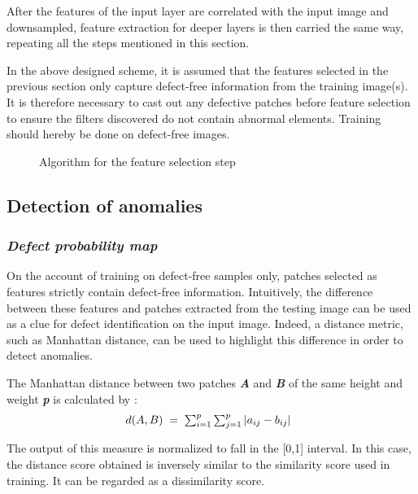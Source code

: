 \documentclass[3p,,preprint,review,12pt]{elsarticle}
\makeatletter
\def\fixFloatSize#1{}%
\makeatother
\begin{document}
After the features of the input layer are correlated with the input image and downsampled, feature extraction for deeper layers is then carried the same way, repeating all the steps mentioned in this section. 

In the above designed scheme, it is assumed that the features selected in the previous section only capture defect-free information from the training image(s). It is therefore necessary to cast out any defective patches before feature selection to ensure the filters discovered do not contain abnormal elements. Training should hereby be done on defect-free images. 


\bgroup
\fixFloatSize{Figures/Figure5.jpg}
\begin{figure}[!htbp]
\centering \makeatletter{}
\makeatother 
\caption{{Algorithm for the feature selection step}}
\label{f-6b30a3d493fd}
\end{figure}
\egroup




\subsection{Detection of anomalies}



\subsubsection{\textit{Defect probability map }}
On the account of training on defect-free samples only, patches selected as features strictly contain defect-free information. Intuitively, the difference between these features and patches extracted from the testing image can be used as a clue for defect identification on the input image. Indeed, a distance metric, such as Manhattan distance, can be used to highlight this difference in order to detect anomalies. 

The Manhattan distance between two patches \textbf{\textit{A}} and \textbf{\textit{B}} of the same height and weight \textbf{\textit{p}} is calculated by :
\let\saveeqnno\theequation
\let\savefrac\frac
\def\dispfrac{\displaystyle\savefrac}
\begin{eqnarray}
\let\frac\dispfrac
\gdef\theequation{8}
\let\theHequation\theequation
\label{dfg-2cab24e92b77}
\begin{array}{@{}l}d(A,B)\;=\;\sum_{i=1}^{p}\sum_{j=1}^{p}\left|a_{ij}-b_{ij}\right|\end{array}
\end{eqnarray}
\global\let\theequation\saveeqnno
\addtocounter{equation}{-1}\ignorespaces 
The output of this measure is normalized to fall in the [0,1] interval. In this case, the distance score obtained is inversely similar to the similarity score used in training. It can be regarded as a dissimilarity score. 
\end{document}
